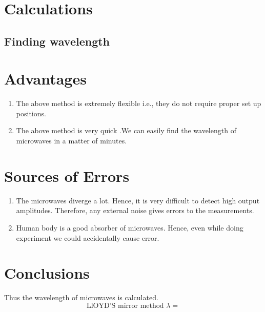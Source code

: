 \documentclass[
	letterpaper, %
	10pt, %
]{CSUniSchoolLabReport}
\begin{document}
\section{Calculations}
\subsection{Finding wavelength}
\section{Advantages}
\begin{enumerate}
	\item The above method is extremely flexible i.e., they do not require proper set up positions. 
	\item The above method is very quick .We can easily find the wavelength of microwaves in a
	matter of minutes. 
\end{enumerate}
\section{Sources of Errors}
\begin{enumerate}
	\item The microwaves diverge a lot. Hence, it is very difficult to detect high output amplitudes.
	Therefore, any external noise gives errors to the measurements. 
	\item Human body is a good absorber of microwaves. Hence, even while doing experiment we could
	accidentally cause error. 
\end{enumerate}
\section{Conclusions}
Thus the wavelength of microwaves is calculated. 
\[
	\boxed{\text{LlOYD'S mirror method } \lambda = }
\]
\end{document}
